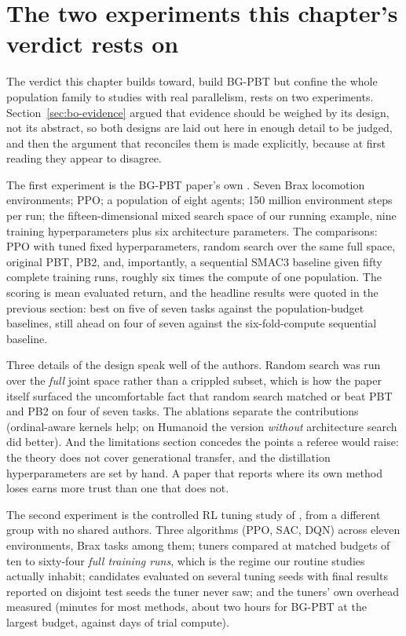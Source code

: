 \section{The two experiments this chapter's verdict rests on}
\label{sec:pop-evidence}

The verdict this chapter builds toward, build BG-PBT but confine the
whole population family to studies with real parallelism, rests on two
experiments. Section~\ref{sec:bo-evidence} argued that evidence should
be weighed by its design, not its abstract, so both designs are laid
out here in enough detail to be judged, and then the argument that
reconciles them is made explicitly, because at first reading they
appear to disagree.

The first experiment is the BG-PBT paper's own
\citep{wan2022bgpbt}. Seven Brax locomotion environments; PPO; a
population of eight agents; 150 million environment steps per run; the
fifteen-dimensional mixed search space of our running example, nine
training hyperparameters plus six architecture parameters. The
comparisons: PPO with tuned fixed hyperparameters, random search over
the same full space, original PBT, PB2, and, importantly, a
sequential SMAC3 baseline given fifty complete training runs, roughly
six times the compute of one population. The scoring is mean evaluated
return, and the headline results were quoted in the previous section:
best on five of seven tasks against the population-budget baselines,
still ahead on four of seven against the six-fold-compute sequential
baseline.

Three details of the design speak well of the authors.
Random search was run over the \emph{full} joint space rather than a
crippled subset, which is how the paper itself surfaced the
uncomfortable fact that random search matched or beat PBT and PB2 on
four of seven tasks. The ablations separate the contributions
(ordinal-aware kernels help; on Humanoid the version \emph{without}
architecture search did better). And the limitations section concedes
the points a referee would raise: the theory does not cover
generational transfer, and the distillation hyperparameters are set by
hand. A paper that reports where its own method loses earns more trust
than one that does not.

The second experiment is the controlled RL tuning study of
\citet{eimer2023hyperparameters}, from a different group with no
shared authors. Three algorithms (PPO, SAC, DQN) across eleven
environments, Brax tasks among them; tuners compared at matched
budgets of ten to sixty-four \emph{full training runs}, which is the
regime our routine studies actually inhabit; candidates evaluated on
several tuning seeds with final results reported on disjoint test
seeds the tuner never saw; and the tuners' own overhead measured
(minutes for most methods, about two hours for BG-PBT at the largest
budget, against days of trial compute).

